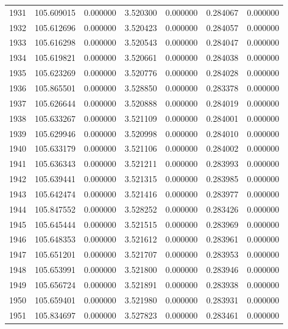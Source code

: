 \begin{tabular}{rrrrrrr}
1931 & 105.609015 &    0.000000 &  3.520300 &    0.000000 &    0.284067 &  0.000000 \\
1932 & 105.612696 &    0.000000 &  3.520423 &    0.000000 &    0.284057 &  0.000000 \\
1933 & 105.616298 &    0.000000 &  3.520543 &    0.000000 &    0.284047 &  0.000000 \\
1934 & 105.619821 &    0.000000 &  3.520661 &    0.000000 &    0.284038 &  0.000000 \\
1935 & 105.623269 &    0.000000 &  3.520776 &    0.000000 &    0.284028 &  0.000000 \\
1936 & 105.865501 &    0.000000 &  3.528850 &    0.000000 &    0.283378 &  0.000000 \\
1937 & 105.626644 &    0.000000 &  3.520888 &    0.000000 &    0.284019 &  0.000000 \\
1938 & 105.633267 &    0.000000 &  3.521109 &    0.000000 &    0.284001 &  0.000000 \\
1939 & 105.629946 &    0.000000 &  3.520998 &    0.000000 &    0.284010 &  0.000000 \\
1940 & 105.633179 &    0.000000 &  3.521106 &    0.000000 &    0.284002 &  0.000000 \\
1941 & 105.636343 &    0.000000 &  3.521211 &    0.000000 &    0.283993 &  0.000000 \\
1942 & 105.639441 &    0.000000 &  3.521315 &    0.000000 &    0.283985 &  0.000000 \\
1943 & 105.642474 &    0.000000 &  3.521416 &    0.000000 &    0.283977 &  0.000000 \\
1944 & 105.847552 &    0.000000 &  3.528252 &    0.000000 &    0.283426 &  0.000000 \\
1945 & 105.645444 &    0.000000 &  3.521515 &    0.000000 &    0.283969 &  0.000000 \\
1946 & 105.648353 &    0.000000 &  3.521612 &    0.000000 &    0.283961 &  0.000000 \\
1947 & 105.651201 &    0.000000 &  3.521707 &    0.000000 &    0.283953 &  0.000000 \\
1948 & 105.653991 &    0.000000 &  3.521800 &    0.000000 &    0.283946 &  0.000000 \\
1949 & 105.656724 &    0.000000 &  3.521891 &    0.000000 &    0.283938 &  0.000000 \\
1950 & 105.659401 &    0.000000 &  3.521980 &    0.000000 &    0.283931 &  0.000000 \\
1951 & 105.834697 &    0.000000 &  3.527823 &    0.000000 &    0.283461 &  0.000000 \\

\end{tabular}
